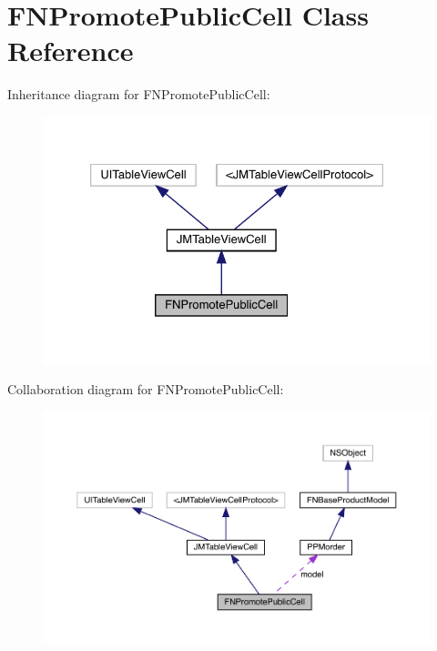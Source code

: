 \hypertarget{interface_f_n_promote_public_cell}{}\section{F\+N\+Promote\+Public\+Cell Class Reference}
\label{interface_f_n_promote_public_cell}


Inheritance diagram for F\+N\+Promote\+Public\+Cell\+:\nopagebreak
\begin{figure}[H]
\begin{center}
\leavevmode
\includegraphics[width=326pt]{interface_f_n_promote_public_cell__inherit__graph}
\end{center}
\end{figure}


Collaboration diagram for F\+N\+Promote\+Public\+Cell\+:\nopagebreak
\begin{figure}[H]
\begin{center}
\leavevmode
\includegraphics[width=350pt]{interface_f_n_promote_public_cell__coll__graph}
\end{center}
\end{figure}
